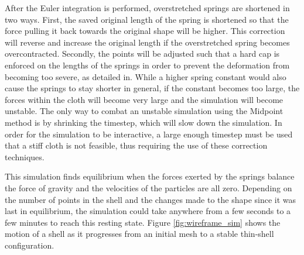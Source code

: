 \documentclass{thesis}
\begin{document}
After the Euler integration is performed, overstretched springs are shortened in two ways.  First, the saved original length of the
spring is shortened so that the force pulling it back towards the original shape will be higher.  This correction will reverse and
increase the original length if the overstretched spring becomes overcontracted.  Secondly, the points will be adjusted such that
a hard cap is enforced on the lengths of the springs in order to prevent the deformation from becoming too severe, as detailed
in\cite{provot95deformationconstraints}.  While a higher spring constant would also cause the springs to stay shorter in general,
if the constant becomes too large, the forces within the cloth will become very large and the simulation will become
unstable.  The only way to combat an unstable simulation using the Midpoint method is by shrinking the timestep, which
will slow down the simulation.  In order for the simulation to be interactive, a large enough timestep must be used that a stiff
cloth is not feasible, thus requiring the use of these correction techniques.

This simulation finds equilibrium when the forces exerted by the springs balance the force of gravity and the velocities of the particles
are all zero.  Depending on the number of points in the shell and the changes made to the shape since it was last in equilibrium, the
simulation could take anywhere from a few seconds to a few minutes to reach this resting state.  Figure \ref{fig:wireframe_sim} shows
the motion of a shell as it progresses from an initial mesh to a stable thin-shell configuration.
\end{document}
